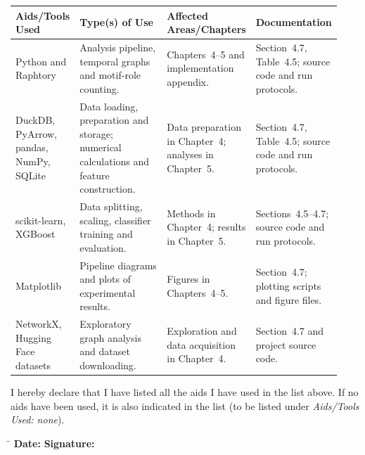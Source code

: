 \begin{center}
\small
\setlength{\tabcolsep}{3pt}
\renewcommand{\arraystretch}{1.15}
\begin{tabular}{|p{0.15\linewidth}|p{0.32\linewidth}|p{0.22\linewidth}|p{0.23\linewidth}|}
\hline
\raggedright \textbf{Aids/Tools Used} &
\raggedright \textbf{Type(s) of Use} &
\raggedright \textbf{Affected Areas/Chapters} &
\raggedright \textbf{Documentation} \tabularnewline \hline
\raggedright Python and Raphtory &
\raggedright Analysis pipeline, temporal graphs and motif-role counting. &
\raggedright Chapters~4--5 and implementation appendix. &
\raggedright Section~4.7, Table~4.5; source code and run protocols. \tabularnewline \hline
\raggedright DuckDB, PyArrow, pandas, NumPy, SQLite &
\raggedright Data loading, preparation and storage; numerical calculations and feature
construction. &
\raggedright Data preparation in Chapter~4; analyses in Chapter~5. &
\raggedright Section~4.7, Table~4.5; source code and run protocols. \tabularnewline \hline
\raggedright scikit-learn, XGBoost &
\raggedright Data splitting, scaling, classifier training and evaluation. &
\raggedright Methods in Chapter~4; results in Chapter~5. &
\raggedright Sections~4.5--4.7; source code and run protocols. \tabularnewline \hline
\raggedright Matplotlib &
\raggedright Pipeline diagrams and plots of experimental results. &
\raggedright Figures in Chapters~4--5. &
\raggedright Section~4.7; plotting scripts and figure files. \tabularnewline \hline
\raggedright NetworkX, Hugging Face datasets &
\raggedright Exploratory graph analysis and dataset downloading. &
\raggedright Exploration and data acquisition in Chapter~4. &
\raggedright Section~4.7 and project source code. \tabularnewline \hline
\end{tabular}
\end{center}

\vspace{2cm}

\noindent I hereby declare that I have listed all the aids I have used in the list above. If no aids have been used, it is also indicated in the list (to be listed under \textit{Aids/Tools Used: none}).

\vspace{2cm}

\begin{tabbing}
    \hspace{5cm} \= \hspace{5cm} \kill
    \textbf{Date:}  \> \textbf{Signature:} \\
\end{tabbing}

\clearpage
\endgroup
